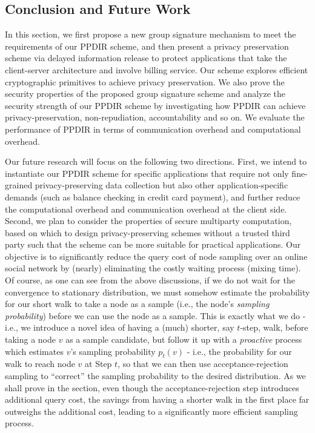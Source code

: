 \documentclass[letterpaper,12pt]{article}
\begin{document}
\subsection{Conclusion and Future Work}\label{sec:conclusion}

In this section, we first propose a new group signature mechanism to meet the requirements of our PPDIR scheme, and then present a privacy preservation scheme via delayed information release to protect applications that take the client-server architecture and involve billing service. Our scheme explores efficient cryptographic primitives to achieve privacy preservation. We also prove the security properties of the proposed group signature scheme and analyze the security strength of our PPDIR scheme by investigating how PPDIR can achieve privacy-preservation, non-repudiation, accountability and so on. We evaluate the performance of PPDIR in terms of communication overhead and computational overhead.

Our future research will focus on the following two directions. First, we intend to instantiate our PPDIR scheme for specific applications that require not only fine-grained privacy-preserving data collection but also other application-specific demands (such as balance checking in credit card payment), and further reduce the computational overhead and communication overhead at the client side. Second, we plan to consider the properties of secure multiparty computation, based on which to design privacy-preserving schemes without a trusted third party such that the scheme can be more suitable for practical applications.
      Our objective is to significantly reduce the query cost of node sampling over an online social network by (nearly) eliminating the costly waiting process (mixing time). Of course, as one can see from the above discussions, if we do not wait for the convergence to stationary distribution, we must somehow estimate the probability for our short walk to take a node as a sample (i.e., the node's {\em sampling probability}) before we can use the node as a sample. This is exactly what we do - i.e., we introduce a novel idea of having a (much) shorter, say $t$-step, walk, before taking a node $v$ as a sample candidate, but follow it up with a {\em proactive} process which estimates $v$'s sampling probability $p_t(v)$ - i.e., the probability for our walk to reach node $v$ at Step $t$, so that we can then use acceptance-rejection sampling to ``correct'' the sampling probability to the desired distribution. As we shall prove in the section, even though the acceptance-rejection step introduces additional query cost, the savings from having a shorter walk in the first place far outweighs the additional cost, leading to a significantly more efficient sampling process.
\end{document}

